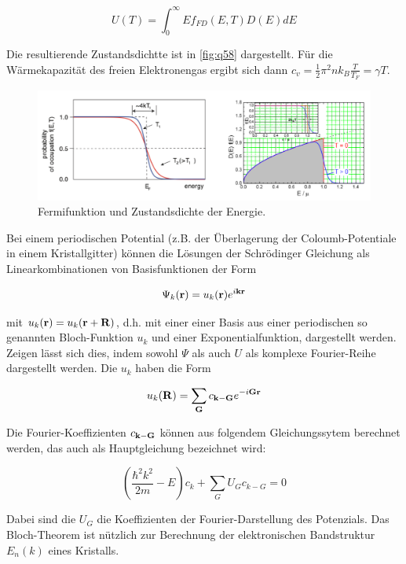\[ U(T) = \displaystyle \int_0^\infty E f_{FD}(E,T) D(E) dE \]

Die resultierende Zustandsdichtte ist in \autoref{fig:q58} dargestellt. Für die Wärmekapazität des freien Elektronengas ergibt sich dann \( c_v = \frac{1}{2} \pi^2 nk_B \frac{T}{T_F} = \gamma T\). 

\begin{figure}[H]
    \centering
    \includegraphics[width=\textwidth]{resources/24-03-2015/D(E)f(E).png}
    \caption{Fermifunktion und Zustandsdichte der Energie.}
    \label{fig:q58}
\end{figure}

\label{q:59}

Bei einem periodischen Potential (z.B. der Überlagerung der Coloumb-Potentiale in einem Kristallgitter) können die Lösungen der Schrödinger Gleichung als Linearkombinationen von Basisfunktionen der Form

\[ \Psi_k(\vb{r}) = u_k(\vb{r}) e^{i\vb{k}\vb{r}}\]

mit \( u_k(\vb{r}) = u_k(\vb{r} + \vb{R}) \), d.h. mit einer einer Basis aus einer periodischen so genannten Bloch-Funktion $u_k$ und einer Exponentialfunktion, dargestellt werden. Zeigen lässt sich dies, indem sowohl $\Psi$ als auch $U$ als komplexe Fourier-Reihe dargestellt werden. Die $u_k$ haben die Form

\[ u_k(\vb{R}) = \displaystyle \sum_{\vb{G}} c_{\vb{k}-\vb{G}}  e^{-i \vb{G} \vb{r}} \]

Die Fourier-Koeffizienten $c_{\vb{k}-\vb{G}}$ können aus folgendem Gleichungssytem berechnet werden, das auch als Hauptgleichung bezeichnet wird:

\[ \left( \frac{\hbar^2 k^2}{2m} - E \right) c_k + \displaystyle \sum_G U_G c_{k-G} = 0 \]

Dabei sind die $U_G$ die Koeffizienten der Fourier-Darstellung des Potenzials. Das Bloch-Theorem ist nützlich zur Berechnung der elektronischen Bandstruktur $E_n(k)$ eines Kristalls. 

\label{q:60}

\newpage